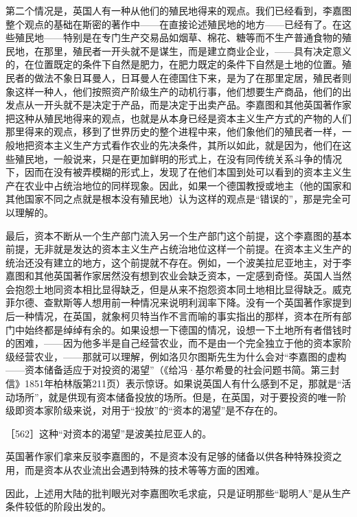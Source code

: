 第二个情况是，英国人有一种从他们的殖民地得来的观点。我们已经看到，李嘉图整个观点的基础在斯密的著作中——在直接论述殖民地的地方——已经有了。在这些殖民地——特别是在专门生产交易品如烟草、棉花、糖等而不生产普通食物的殖民地，在那里，殖民者一开头就不是谋生，而是建立商业企业，——具有决定意义的，在位置既定的条件下自然是肥力，在肥力既定的条件下自然是土地的位置。殖民者的做法不象日耳曼人，日耳曼人在德国住下来，是为了在那里定居，殖民者则象这样一种人，他们按照资产阶级生产的动机行事，他们想要生产商品，他们的出发点从一开头就不是决定于产品，而是决定于出卖产品。李嘉图和其他英国著作家把这种从殖民地得来的观点，也就是从本身已经是资本主义生产方式的产物的人们那里得来的观点，移到了世界历史的整个进程中来，他们象他们的殖民者一样，一般地把资本主义生产方式看作农业的先决条件，其所以如此，就是因为，他们在这些殖民地，一般说来，只是在更加鲜明的形式上，在没有同传统关系斗争的情况下，因而在没有被弄模糊的形式上，发现了在他们本国到处可以看到的资本主义生产在农业中占统治地位的同样现象。因此，如果一个德国教授或地主（他的国家和其他国家不同之点就是根本没有殖民地）认为这样的观点是“错误的”，那是完全可以理解的。

最后，资本不断从一个生产部门流入另一个生产部门这个前提，这个李嘉图的基本前提，无非就是发达的资本主义生产占统治地位这样一个前提。在资本主义生产的统治还没有建立的地方，这个前提就不存在。例如，一个波美拉尼亚地主，对于李嘉图和其他英国著作家居然没有想到农业会缺乏资本，一定感到奇怪。英国人当然会抱怨土地同资本相比显得缺乏，但是从来不抱怨资本同土地相比显得缺乏。威克菲尔德、查默斯等人想用前一种情况来说明利润率下降。没有一个英国著作家提到后一种情况，在英国，就象柯贝特当作不言而喻的事实指出的那样，资本在所有部门中始终都是绰绰有余的。如果设想一下德国的情况，设想一下土地所有者借钱时的困难，——因为他多半是自己经营农业，而不是由一个完全独立于他的资本家阶级经营农业，——那就可以理解，例如洛贝尔图斯先生为什么会对“李嘉图的虚构——资本储备适应于对投资的渴望”（《给冯·基尔希曼的社会问题书简。第三封信》1851年柏林版第211页）表示惊讶。如果说英国人有什么感到不足，那就是“活动场所”，就是供现有资本储备投放的场所。但是，在英国，对于要投资的唯一阶级即资本家阶级来说，对用于“投放”的“资本的渴望”是不存在的。

［562］这种“对资本的渴望”是波美拉尼亚人的。

英国著作家们拿来反驳李嘉图的，不是资本没有足够的储备以供各种特殊投资之用，而是资本从农业流出会遇到特殊的技术等等方面的困难。

因此，上述用大陆的批判眼光对李嘉图吹毛求疵，只是证明那些“聪明人”是从生产条件较低的阶段出发的。



